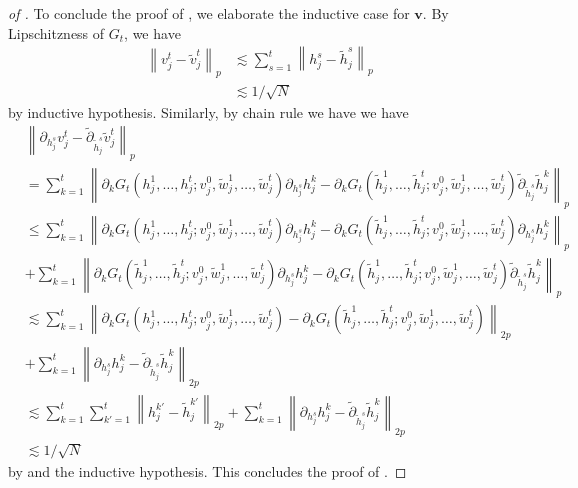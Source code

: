 \documentclass[10pt,a4paper]{amsart}
\newcommand{\bfv}{\boldsymbol{v}}
\newcommand{\norm}[1]{\left\lVert#1\right\rVert}
\begin{document}
\begin{proof}[of ]
To conclude the proof of , we elaborate the inductive case for $\bfv.$ By Lipschitzness of $G_t$, we have 
\begin{align*}
    \norm{v_j^t - \tilde{v}_j^t}_p &\lesssim \sum_{s=1}^{t}\norm{h_j^s - \tilde{h}_j^s}_p \\
    &\lesssim 1/\sqrt{N}
\end{align*}
by inductive hypothesis. Similarly, by chain rule we have we have 
\begin{align*}
&\norm{\partial_{h_j^s} v_j^t - \tilde{\partial}_{\tilde{h}_j^s} \tilde{v}_j^t}_p \\
&= \sum_{k=1}^t \norm{\partial_k G_t(h_j^1, \dots, h_j^t; v_j^0,\tilde{w}_j^1,\dots, \tilde{w}_j^t) \partial_{h_j^s} h_j^k - \partial_k G_t(\tilde{h}_j^1, \dots, \tilde{h}_j^t; v_j^0,\tilde{w}_j^1,\dots, \tilde{w}_j^t) \tilde{\partial}_{\tilde{h}_j^s} \tilde{h}_j^k  }_p \\
&\leq \sum_{k=1}^t \norm{\partial_k G_t(h_j^1, \dots, h_j^t; v_j^0,\tilde{w}_j^1,\dots, \tilde{w}_j^t) \partial_{h_j^s} h_j^k - \partial_k G_t(\tilde{h}_j^1, \dots, \tilde{h}_j^t; v_j^0,\tilde{w}_j^1,\dots, \tilde{w}_j^t) \partial_{h_j^s} h_j^k}_p \\
&+ \sum_{k=1}^t \norm{\partial_k G_t(\tilde{h}_j^1, \dots, \tilde{h}_j^t; v_j^0,\tilde{w}_j^1,\dots, \tilde{w}_j^t) \partial_{h_j^s} h_j^k- \partial_k G_t(\tilde{h}_j^1, \dots, \tilde{h}_j^t; v_j^0,\tilde{w}_j^1,\dots, \tilde{w}_j^t) \tilde{\partial}_{\tilde{h}_j^s} \tilde{h}_j^k  }_p  \\
&\lesssim \sum_{k=1}^t \norm{\partial_k G_t(h_j^1, \dots, h_j^t; v_j^0,\tilde{w}_j^1,\dots, \tilde{w}_j^t) - \partial_k G_t(\tilde{h}_j^1, \dots, \tilde{h}_j^t; v_j^0,\tilde{w}_j^1,\dots, \tilde{w}_j^t) }_{2p}\\
&+ \sum_{k=1}^t \norm{ \partial_{h_j^s} h_j^k-  \tilde{\partial}_{\tilde{h}_j^s} \tilde{h}_j^k  }_{2p} \\
&\lesssim \sum_{k=1}^t\sum_{k'=1}^t \norm{h_j^{k'} - \tilde{h}_j^{k'}}_{2p} + \sum_{k=1}^t \norm{ \partial_{h_j^s} h_j^k-  \tilde{\partial}_{\tilde{h}_j^s} \tilde{h}_j^k  }_{2p} \\ 
&\lesssim 1/\sqrt{N}
\end{align*} 
by  and the inductive hypothesis. This concludes the proof of .
\end{proof}
\end{document}
